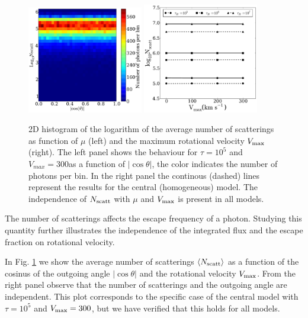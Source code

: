\documentclass{emulateapj}
\newcommand{\ly}{{\ifmmode{{\rm Ly}\alpha~}\else{Ly$\alpha$~}\fi}}
\newcommand{\kms}{{\ifmmode{{\mathrm{\,km\ s}^{-1}}}\else{\,km~s$^{-1}$}\fi}}
\begin{document}
\begin{figure}
\begin{center}
    \includegraphics[width=0.45\textwidth]{f12.pdf}
    \includegraphics[width=0.45\textwidth]{f13.pdf}
\end{center}
\caption{2D histogram of the logarithm of the average number of scatterings as function of $\mu$ (left) and the maximum rotational velocity $V_{\rm
max}$ (right). The left panel shows the behaviour for $\tau=10^{5}$ and
  $V_{max}=300$\kms as a function of $\left|\cos\theta\right|$, the color indicates the number of photons per bin. In the
  right panel the continous (dashed) lines represent the results for
  the central (homogeneous) model. The independence of $N_{\rm scatt}$ with $\mu$ and $V_{\rm max}$ is
  present in all models.  
\label{fig:Nscatt} }
\end{figure}

The number of scatterings affects the escape frequency of a \ly
photon. Studying this quantity further illustrates the independence of
the integrated flux and the escape fraction on rotational velocity.

In Fig. \ref{fig:Nscatt} we show the average number of scatterings
$\langle N_{\rm scatt}\rangle$ as a function of the cosinus of the
outgoing angle $|\cos\theta|$ and the rotational velocity
$V_{\rm max}$. 
From the right panel observe that the number of scatterings and the
outgoing angle are independent. 
This plot corresponds to the specific case of the central model with
$\tau=10^5$ and $V_{\rm max}=300$\kms, but we have verified that this
holds for all models. 
\end{document}
